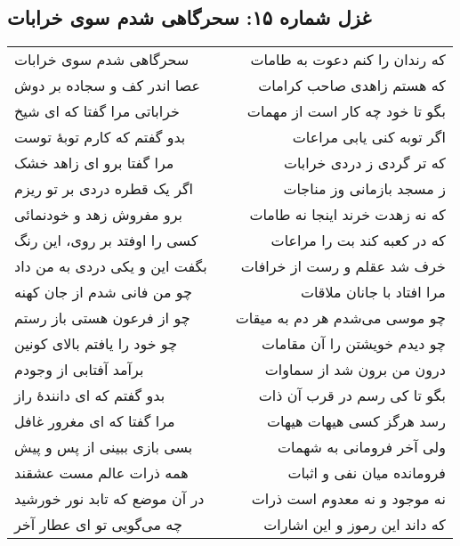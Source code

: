 \begin{center}
\section*{غزل شماره ۱۵: سحرگاهی شدم سوی خرابات}
\label{sec:015}
\begin{longtable}{l p{0.5cm} r}
سحرگاهی شدم سوی خرابات
&&
که رندان را کنم دعوت به طامات
\\
عصا اندر کف و سجاده بر دوش
&&
که هستم زاهدی صاحب کرامات
\\
خراباتی مرا گفتا که ای شیخ
&&
بگو تا خود چه کار است از مهمات
\\
بدو گفتم که کارم توبهٔ توست
&&
اگر توبه کنی یابی مراعات
\\
مرا گفتا برو ای زاهد خشک
&&
که تر گردی ز دردی خرابات
\\
اگر یک قطره دردی بر تو ریزم
&&
ز مسجد بازمانی وز مناجات
\\
برو مفروش زهد و خودنمائی
&&
که نه زهدت خرند اینجا نه طامات
\\
کسی را اوفتد بر روی، این رنگ
&&
که در کعبه کند بت را مراعات
\\
بگفت این و یکی دردی به من داد
&&
خرف شد عقلم و رست از خرافات
\\
چو من فانی شدم از جان کهنه
&&
مرا افتاد با جانان ملاقات
\\
چو از فرعون هستی باز رستم
&&
چو موسی می‌شدم هر دم به میقات
\\
چو خود را یافتم بالای کونین
&&
چو دیدم خویشتن را آن مقامات
\\
برآمد آفتابی از وجودم
&&
درون من برون شد از سماوات
\\
بدو گفتم که ای دانندهٔ راز
&&
بگو تا کی رسم در قرب آن ذات
\\
مرا گفتا که ای مغرور غافل
&&
رسد هرگز کسی هیهات هیهات
\\
بسی بازی ببینی از پس و پیش
&&
ولی آخر فرومانی به شهمات
\\
همه ذرات عالم مست عشقند
&&
فرومانده میان نفی و اثبات
\\
در آن موضع که تابد نور خورشید
&&
نه موجود و نه معدوم است ذرات
\\
چه می‌گویی تو ای عطار آخر
&&
که داند این رموز و این اشارات
\\
\end{longtable}
\end{center}
